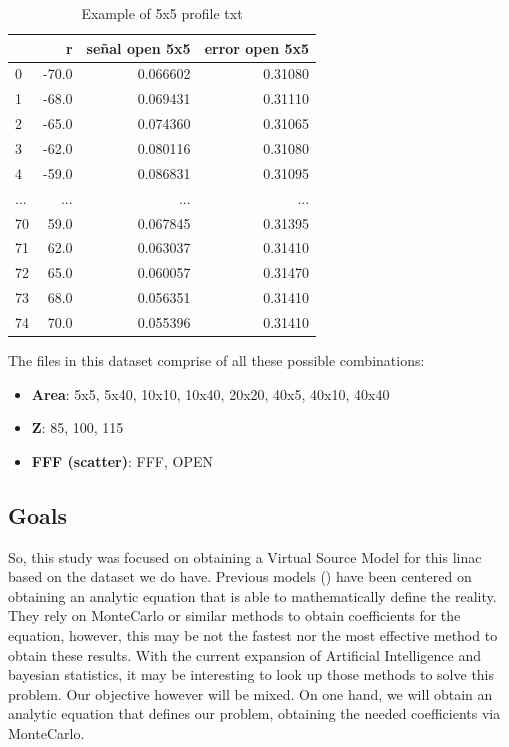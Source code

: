 \documentclass[openany]{article}
\begin{document}
\begin{table}[!h]
    \centering
\begin{tabular}{lrrr}
\toprule
{} &     \textbf{r} &  \textbf{señal open 5x5} &  \textbf{error open 5x5} \\
\midrule
\hline
\hline

0 & -70.0 &        0.066602 &         0.31080 \\
1 & -68.0 &        0.069431 &         0.31110 \\
2 & -65.0 &        0.074360 &         0.31065 \\
3 & -62.0 &        0.080116 &         0.31080 \\
4 & -59.0 &        0.086831 &         0.31095 \\
... & ... & ... & ... \\
70 &  59.0 &        0.067845 &         0.31395 \\
71 &  62.0 &        0.063037 &         0.31410 \\
72 &  65.0 &        0.060057 &         0.31470 \\
73 &  68.0 &        0.056351 &         0.31410 \\
74 &  70.0 &        0.055396 &         0.31410 \\
\hline
\hline

\bottomrule
\end{tabular}
\caption{Example of 5x5 profile txt}
    \label{tab:my_label}
\end{table}

\newpage 

The files in this dataset comprise of all these possible combinations:

\begin{itemize}
    \item \textbf{Area}: 5x5, 5x40, 10x10, 10x40, 20x20, 40x5, 40x10, 40x40
    \item \textbf{Z}: 85, 100, 115
    \item \textbf{FFF (scatter)}: FFF, OPEN
\end{itemize}


\newpage 

\subsection{Goals}

So, this study was focused on obtaining a Virtual Source Model for this linac based on the dataset we do have. Previous models (\cite{BenitesR2012, Gonzalez2015, Tessonnier, 10.1007/978-3-642-21198-0_318, https://doi.org/10.1120/jacmp.v16i1.4992, phdthesis, GONZALEZ201716}) have been centered on obtaining an analytic equation that is able to mathematically define the reality. They rely on MonteCarlo or similar methods to obtain coefficients for the equation, however, this may be not the fastest nor the most effective method to obtain these results. With the current expansion of Artificial Intelligence and bayesian statistics, it may be interesting to look up those methods to solve this problem. Our objective however will be mixed. On one hand, we will obtain an analytic equation that defines our problem, obtaining the needed coefficients via MonteCarlo. \\
\end{document}
